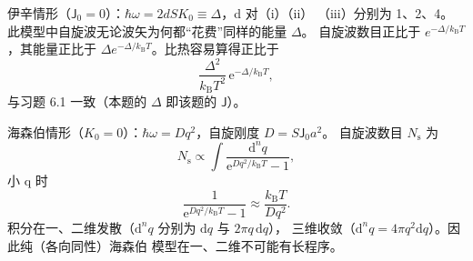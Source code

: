 伊辛情形（$\mathsf{J}_0=0$）：$\hbar\omega=2dSK_0\equiv\Delta$，d 对（i）（ii）
（iii）分别为 1、2、4。此模型中自旋波无论波矢为何都“花费”同样的能量 $\Delta$。
自旋波数目正比于 $e^{-\Delta/k_{\mathrm{B}}T}$，其能量正比于
$\Delta e^{-\Delta/k_{\mathrm{B}}T}$。比热容易算得正比于
\begin{equation*}
\frac{\Delta^{2}}{k_{\mathrm{B}}T^{2}}\,\mathrm{e}^{-\Delta/k_{\mathrm{B}}T},
\end{equation*}
与习题 6.1 一致（本题的 $\Delta$ 即该题的 $\mathsf{J}$）。

海森伯情形（$K_0=0$）：$\hbar\omega=Dq^{2}$，自旋刚度 $D=S\mathsf{J}_0a^{2}$。
自旋波数目 $N_{\mathrm{s}}$ 为
\begin{equation*}
N_{\mathrm{s}} \propto \int\frac{\mathrm{d}^{n}q}{\mathrm{e}^{Dq^{2}/k_{\mathrm{B}}T}-1},\tag{F.62}
\end{equation*}
小 q 时
\begin{equation*}
\frac{1}{\mathrm{e}^{Dq^{2}/k_{\mathrm{B}}T}-1} \approx \frac{k_{\mathrm{B}}T}{Dq^{2}}.\tag{F.63}
\end{equation*}
积分在一、二维发散（$\mathrm{d}^{n}q$ 分别为 $\mathrm{d}q$ 与 $2\pi q\,\mathrm{d}q$），
三维收敛（$\mathrm{d}^{n}q=4\pi q^{2}\mathrm{d}q$）。因此纯（各向同性）海森伯
模型在一、二维不可能有长程序。

